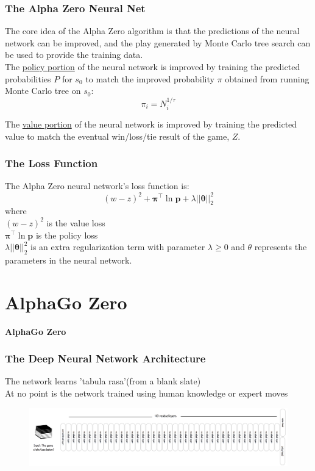 \documentclass[notheorems, aspectratio=54]{beamer}
\begin{document}
\begin{frame}
    \frametitle{The Alpha Zero Neural Net}
    The core idea of the Alpha Zero algorithm is that the predictions of the neural network can be improved, and the play generated by Monte Carlo tree search can be used to provide the training data.
    \\[1em]
    The \underline{policy portion} of the neural network is improved by training the predicted probabilities $P$ for $s_0$ to match the improved probability $\pi$ obtained from running Monte Carlo tree on $s_0$:
    $$
    \pi_i = N_i^{1/\tau}
    $$

    The \underline{value portion} of the neural network is improved by training the predicted value to match the eventual win/loss/tie result of the game, $Z$.
\end{frame}

\begin{frame}
    \frametitle{The Loss Function}

    The Alpha Zero neural network's loss function is:
    $$
    (w-z)^2 + \bm{\pi}^\intercal \ln \mathbf{p} + \lambda ||\bm{\theta}||_2^2
    $$
    where \\
    \hspace{2em} $(w-z)^2$ is the value loss \\
    \hspace{2em} $\bm{\pi}^\intercal \ln \mathbf{p}$ is the policy loss \\
    \hspace{2em} $\lambda ||\bm{\theta}||_2^2$ is an extra regularization term with parameter $\lambda \ge 0$ and $\theta$ represents the parameters in the neural network.
\end{frame}


\section{AlphaGo Zero}
\begin{frame}
    \center \huge \textbf{AlphaGo Zero}
\end{frame}

\begin{frame}
    \frametitle{The Deep Neural Network Architecture}

    The network learns 'tabula rasa'(from a blank slate)
    \\[.5em]
    At no point is the network trained using human knowledge or expert moves
    \\[.5em]
    \begin{figure}
        \includegraphics[width=\textwidth]{fig/neural_netwrok_architecture.png}
    \end{figure}
\end{frame}
\end{document}
